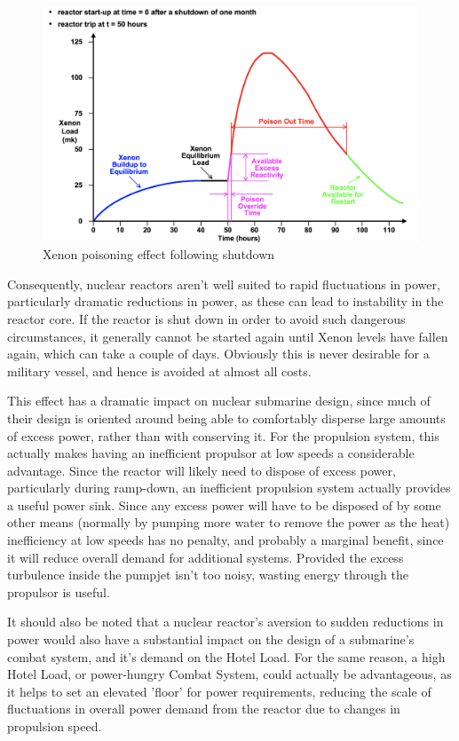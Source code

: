 \documentclass{article}\usepackage[]{graphicx}\usepackage[]{color}
\begin{document}
\begin{figure}
\includegraphics[width=\textwidth]{XenonPoison.png}
\caption{Xenon poisoning effect following shutdown \parencite{garland2005}}
\label{fig:XenonPoison.png}
\end{figure}

Consequently, nuclear reactors aren't well suited to rapid fluctuations in power, particularly dramatic reductions in power, as these can lead to instability in the reactor core.  If the reactor is shut down in order to avoid such dangerous circumstances, it generally cannot be started again until Xenon levels have fallen again, which can take a couple of days.  Obviously this is never desirable for a military vessel, and hence is avoided at almost all costs.

This effect has a dramatic impact on nuclear submarine design, since much of their design is oriented around being able to comfortably disperse large amounts of excess power, rather than with conserving it.  For the propulsion system, this actually makes having an inefficient propulsor at low speeds a considerable advantage.  Since the reactor will likely need to dispose of excess power, particularly during ramp-down, an inefficient propulsion system actually provides a useful power sink.  Since any excess power will have to be disposed of by some other means (normally by pumping more water to remove the power as the heat) inefficiency at low speeds has no penalty, and probably a marginal benefit, since it will reduce overall demand for additional systems.    Provided the excess turbulence inside the pumpjet isn't too noisy, wasting energy through the propulsor is useful.

It should also be noted that a nuclear reactor's aversion to sudden reductions in power would also have a substantial impact on the design of a submarine's combat system, and it's demand on the Hotel Load. For the same reason, a high Hotel Load, or power-hungry Combat System, could actually be advantageous, as it helps to set an elevated 'floor' for power requirements, reducing the scale of fluctuations in overall power demand from the reactor due to changes in propulsion speed.
\end{document}
